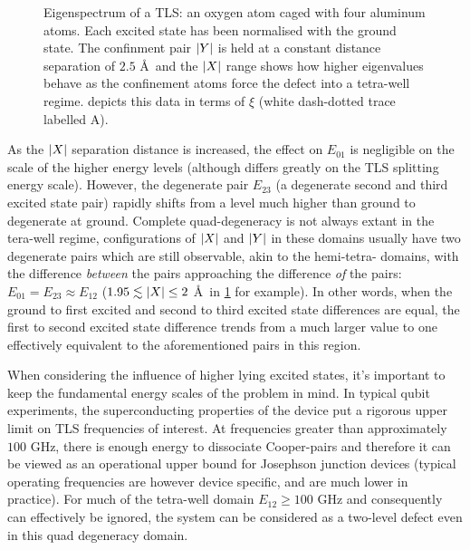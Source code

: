 \begin{figure}[htp]
  \resizebox{0.9\textwidth}{!}{}
  \caption[Eigenspectrum of a  TLS]{\label{fig:tetraspectrum}Eigenspectrum of a  TLS: an oxygen atom caged with four aluminum atoms. Each excited state has been normalised with the ground state. The confinment pair $\lvert Y\rvert$ is held at a constant distance separation of $2.5$ \AA\ and the $\lvert X\rvert$ range shows how higher eigenvalues behave as the confinement atoms force the defect into a tetra-well regime.  depicts this data in terms of $\xi$ (white dash-dotted trace labelled A). }
\end{figure}

As the $\lvert X\rvert$ separation distance is increased, the effect on $E_{01}$ is negligible on the scale of the higher energy levels (although differs greatly on the TLS splitting energy scale).
However, the degenerate pair $E_{23}$ (a degenerate second and third excited state pair) rapidly shifts from a level much higher than ground to degenerate at ground.
Complete quad-degeneracy is not always extant in the tera-well regime, configurations of $\lvert X\rvert$ and $\lvert Y\rvert$ in these domains usually have two degenerate pairs which are still observable, akin to the hemi-tetra- domains, with the difference \textit{between} the pairs approaching the difference \textit{of} the pairs: $E_{01} = E_{23} \approx E_{12}$ ($1.95 \lesssim \lvert X\rvert \leq 2$ \AA\ in \cref{fig:tetraspectrum} for example).
In other words, when the ground to first excited and second to third excited state differences are equal, the first to second excited state difference trends from a much larger value to one effectively equivalent to the aforementioned pairs in this region.

When considering the influence of higher lying excited states, it's important to keep the fundamental energy scales of the problem in mind.
In typical qubit experiments, the superconducting properties of the device put a rigorous upper limit on TLS frequencies of interest.
At frequencies greater than approximately $100$ GHz, there is enough energy to dissociate Cooper-pairs and therefore it can be viewed as an operational upper bound for Josephson junction devices (typical operating frequencies are however device specific, and are much lower in practice).
For much of the tetra-well domain $E_{12} \geq 100$ GHz and consequently can effectively be ignored, the system can be considered as a two-level defect even in this quad degeneracy domain.

